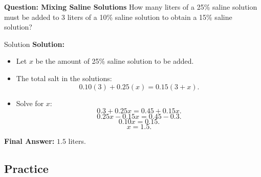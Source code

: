\documentclass{beamer}
\begin{document}
\begin{frame}{\textbf{Question: Mixing Saline Solutions}}
    How many liters of a 25\% saline solution must be added to 3 liters of a 10\% saline solution to obtain a 15\% saline solution?


\end{frame}

\begin{frame}{Solution}
    \textbf{Solution:}
    \begin{itemize}
        \item Let \( x \) be the amount of 25\% saline solution to be added.
        \item The total salt in the solutions:
        \[
        0.10(3) + 0.25(x) = 0.15(3 + x).
        \]
        \item Solve for \( x \):
        \[
        0.3 + 0.25x = 0.45 + 0.15x.
        \]
        \[
        0.25x - 0.15x = 0.45 - 0.3.
        \]
        \[
        0.10x = 0.15.
        \]
        \[
        x = 1.5.
        \]
    \end{itemize}
    \textbf{Final Answer:} \(\boxed{1.5}\) liters.
    
\end{frame}

\begin{frame}
\section{Practice}
\end{frame}
\end{document}
